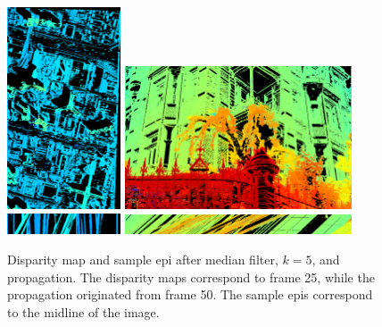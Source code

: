 \documentclass{article}
\theoremstyle{definition}
\begin{document}
\begin{figure}[ht]
  \centering
  \includegraphics[width=0.3\textwidth]{images/1520867757275_dmap_025.png}
  \includegraphics[width=0.6\textwidth]{images/1520877118843_dmap_025.png} \\
  
  \includegraphics[width=0.3\textwidth]{images/1520867757275_epi_colored.png}
  \includegraphics[width=0.6\textwidth]{images/1520877118843_epi_colored.png}
  \caption{Disparity map and sample epi after median filter, $k=5$, and propagation. The disparity maps correspond to frame 25, while the propagation originated from frame 50. The sample epis correspond to the midline of the image.}
  \label{fig:propagation}
\end{figure}
\end{document}
